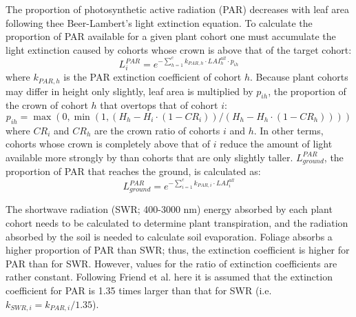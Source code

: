 \documentclass[]{book}
\begin{document}
The proportion of photosynthetic active radiation (PAR) decreases with leaf area following thee Beer-Lambert's light extinction equation. To calculate the proportion of PAR available for a given plant cohort one must accumulate the light extinction caused by cohorts whose crown is above that of the target cohort:
\begin{equation}
L^{PAR}_i=e^{-\sum_{h=1}^{c}{k_{PAR,h} \cdot LAI_{h}^{all} \cdot p_{ih}}}
\end{equation}
where \(k_{PAR,h}\) is the PAR extinction coefficient of cohort \(h\). Because plant
cohorts may differ in height only slightly, leaf area is multiplied by \(p_{ih}\),
the proportion of the crown of cohort \(h\) that overtops that of cohort \(i\):
\begin{equation}
p_{ih}=\max(0,\min(1,(H_h-H_i\cdot (1 - CR_i))/(H_h-H_h\cdot (1 - CR_h))))
\end{equation}
where \(CR_i\) and \(CR_h\) are the crown ratio of cohorts \(i\) and \(h\). In other terms,
cohorts whose crown is completely above that of \(i\) reduce the amount of light
available more strongly by than cohorts that are only slightly taller.
\(L^{PAR}_{ground}\), the proportion of PAR that reaches the ground, is calculated as:
\begin{equation}
L^{PAR}_{ground}=e^{-\sum_{i=1}^{c}{k_{PAR,i} \cdot LAI_{i}^{all}}}
\end{equation}

The shortwave radiation (SWR; 400-3000 nm) energy absorbed by each plant cohort
needs to be calculated to determine plant transpiration, and the radiation absorbed
by the soil is needed to calculate soil evaporation. Foliage absorbs a higher
proportion of PAR than SWR; thus, the extinction coefficient is higher for PAR
than for SWR. However, values for the ratio of extinction coefficients are rather
constant. Following Friend et al. \citeyearpar{Friend1997} here it is assumed that the extinction
coefficient for PAR is 1.35 times larger than that for SWR (i.e.
\(k_{SWR,i} = k_{PAR,i}/1.35\)).
\end{document}
